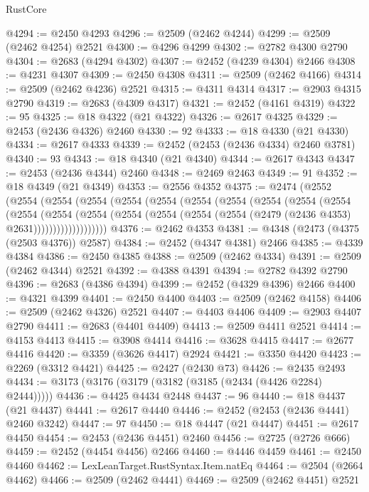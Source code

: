 \begin{lexlean}{RustCore}
\begin{coremodule}
@4294 := @2450 @4293
@4296 := @2509 (@2462 @4244)
@4299 := @2509 (@2462 @4254) @2521
@4300 := @4296 @4299
@4302 := @2782 @4300 @2790
@4304 := @2683 (@4294 @4302)
@4307 := @2452 (@4239 @4304) @2466
@4308 := @4231 @4307
@4309 := @2450 @4308
@4311 := @2509 (@2462 @4166)
@4314 := @2509 (@2462 @4236) @2521
@4315 := @4311 @4314
@4317 := @2903 @4315 @2790
@4319 := @2683 (@4309 @4317)
@4321 := @2452 (@4161 @4319)
@4322 := 95
@4325 := @18 @4322 (@21 @4322)
@4326 := @2617 @4325
@4329 := @2453 (@2436 @4326) @2460
@4330 := 92
@4333 := @18 @4330 (@21 @4330)
@4334 := @2617 @4333
@4339 := @2452 (@2453 (@2436 @4334) @2460 @3781)
@4340 := 93
@4343 := @18 @4340 (@21 @4340)
@4344 := @2617 @4343
@4347 := @2453 (@2436 @4344) @2460
@4348 := @2469 @2463
@4349 := 91
@4352 := @18 @4349 (@21 @4349)
@4353 := @2556 @4352
@4375 := @2474
    (@2552
      (@2554
        (@2554
          (@2554
            (@2554
              (@2554
                (@2554
                  (@2554
                    (@2554
                      (@2554
                        (@2554
                          (@2554
                            (@2554
                              (@2554
                                (@2554
                                  (@2554 (@2554 (@2554 (@2479 (@2436 @4353) @2631)))))))))))))))))))
@4376 := @2462 @4353
@4381 := @4348 (@2473 (@4375 (@2503 @4376)) @2587)
@4384 := @2452 (@4347 @4381) @2466
@4385 := @4339 @4384
@4386 := @2450 @4385
@4388 := @2509 (@2462 @4334)
@4391 := @2509 (@2462 @4344) @2521
@4392 := @4388 @4391
@4394 := @2782 @4392 @2790
@4396 := @2683 (@4386 @4394)
@4399 := @2452 (@4329 @4396) @2466
@4400 := @4321 @4399
@4401 := @2450 @4400
@4403 := @2509 (@2462 @4158)
@4406 := @2509 (@2462 @4326) @2521
@4407 := @4403 @4406
@4409 := @2903 @4407 @2790
@4411 := @2683 (@4401 @4409)
@4413 := @2509 @4411 @2521
@4414 := @4153 @4413
@4415 := @3908 @4414
@4416 := @3628 @4415
@4417 := @2677 @4416
@4420 := @3359 (@3626 @4417) @2924
@4421 := @3350 @4420
@4423 := @2269 (@3312 @4421)
@4425 := @2427 (@2430 @73)
@4426 := @2435 @2493
@4434 := @3173 (@3176 (@3179 (@3182 (@3185 (@2434 (@4426 @2284) @2444)))))
@4436 := @4425 @4434 @2448
@4437 := 96
@4440 := @18 @4437 (@21 @4437)
@4441 := @2617 @4440
@4446 := @2452 (@2453 (@2436 @4441) @2460 @3242)
@4447 := 97
@4450 := @18 @4447 (@21 @4447)
@4451 := @2617 @4450
@4454 := @2453 (@2436 @4451) @2460
@4456 := @2725 (@2726 @666)
@4459 := @2452 (@4454 @4456) @2466
@4460 := @4446 @4459
@4461 := @2450 @4460
@4462 := LexLeanTarget.RustSyntax.Item.natEq
@4464 := @2504 (@2664 @4462)
@4466 := @2509 (@2462 @4441)
@4469 := @2509 (@2462 @4451) @2521

\end{coremodule}
\end{lexlean}
